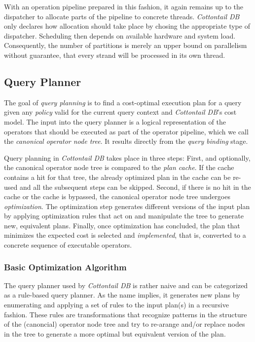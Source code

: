 With an operation pipeline prepared in this fashion, it again remains up to the dispatcher to allocate parts of the pipeline to concrete threads. \emph{Cottontail DB} only declares how allocation should take place by chosing the appropriate type of dispatcher. Scheduling then depends on available hardware and system load. Consequently, the number of partitions is merely an upper bound on parallelism without guarantee, that every strand will be processed in its own thread. 

\subsection{Query Planner}

The goal of \emph{query planning} is to find a cost-optimal execution plan for a query given any \emph{policy} valid for the current query context and \emph{Cottontail DB}'s cost model. The input into the query planner is a logical representation of the operators that should be executed as part of the operator pipeline, which we call the \emph{canonical operator node tree}. It results directly from the \emph{query binding} stage.

Query planning in \emph{Cottontail DB} takes place in three steps: First, and optionally, the canonical operator node tree is compared to the \emph{plan cache}. If the cache contains a hit for that tree, the already optimized plan in the cache can be re-used and all the subsequent steps can be skipped. Second, if there is no hit in the cache or the cache is bypassed, the canonical operator node tree undergoes \emph{optimization}. The optimization step generates different versions of the input plan by applying optimization rules that act on and manipulate the tree to generate new, equivalent plans. Finally, once optimization has concluded, the plan that minimizes the expected cost is selected and \emph{implemented}, that is, converted to a concrete sequence of executable operators.

\subsubsection{Basic Optimization Algorithm}

The query planner used by \emph{Cottontail DB} is rather naive and can be categorized as a rule-based query planner. As the name implies, it generates new plans by enumerating and applying a set of rules to the input plan(s) in a recursive fashion. These rules are transformations that recognize patterns in the structure of the (canoncial) operator node tree and try to re-arange and/or replace nodes in the tree to generate a more optimal but equivalent version of the plan.

